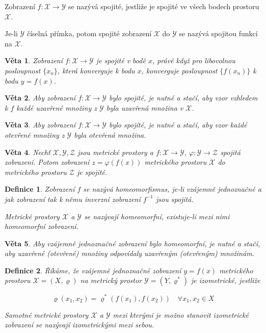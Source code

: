 \documentclass[a4paper, 11pt]{report}
\newtheorem{mydef}{Definice}[chapter]
\newtheorem{veta}{Věta}[chapter]
\begin{document}
Zobrazení $f: \mathcal{X} \to \mathcal{Y}$ se nazývá spojité, jestliže je spojité ve všech bodech prostoru $\mathcal{X}$.

Je-li $\mathcal{Y}$ číselná přímka, potom spojité zobrazení $\mathcal{X}$ do $\mathcal{Y}$ se nazývá spojitou funkcí na $\mathcal{X}$.

\begin{veta}
Zobrazení $f: \mathcal{X} \to \mathcal{Y}$ je spojité v bodě $x$, právě když pro libovolnou posloupnost $\{x_n\}$, která konverguje k bodu $x$, konverguje posloupnost $\{f(x_n)\}$ k bodu $y = f(x)$.
\end{veta}

\begin{veta}
Aby zobrazení $f: \mathcal{X} \to \mathcal{Y}$ bylo spojité, je nutné a stačí, aby vzor vzhledem k $f$ každé uzavřené množiny z $\mathcal{Y}$ byla uzavřená množina v $\mathcal{X}$.
\end{veta}

\begin{veta}
Aby zobrazení $f: \mathcal{X} \to \mathcal{Y}$ bylo spojíté, je nutné a stačí, aby vzor každé otevřené množiny z $\mathcal{Y}$ byla otevřená množina.
\end{veta}

\begin{veta}
Nechť $\mathcal{X}, \mathcal{Y}, \mathcal{Z}$ jsou metrické prostory a $f: \mathcal{X} \to \mathcal{Y}$, $\varphi: \mathcal{Y} \to \mathcal{Z}$ spojitá zobrazení. Potom zobrazení $z = \varphi(f(x))$ metrického prostoru $\mathcal{X}$ do metrického prostoru $\mathcal{Z}$ je spojité.
\end{veta}

\begin{mydef}
Zobrazení $f$ se nazývá homeomorfismus, je-li vzájemně jednoznačné a jak zobrazení tak k němu inverzní zobrazení $f^{-1}$ jsou spojitá.

Metrické prostory $\mathcal{X}$ a $\mathcal{Y}$ se nazývají homeomorfní, existuje-li mezi nimi homeomorfní zobrazení.
\end{mydef}

\begin{veta}
Aby vzájemně jednoznačné zobrazení bylo homeomorfní, je nutné a stačí, aby uzavřené (otevřené) množiny odpovídaly uzavřeným (otevřeným) množinám.
\end{veta}

\begin{mydef}
Říkáme, že vzájemně jednoznačné zobrazení $y = f(x)$ metrického prostoru $\mathcal{X} = (X, \varrho)$ na metrický prostor $\mathcal{Y} = (Y, \varrho^*)$ je izometrické, jestliže

$$ \varrho(x_1, x_2) = \varrho^*(f(x_1), f(x_2)) \quad \forall x_1, x_2 \in X $$

Samotné metrické prostory $\mathcal{X}$ a $\mathcal{Y}$ mezi kterými je možno stanovit izometrické zobrazení se nazývají izometrickými mezi sebou.
\end{mydef}
\end{document}
